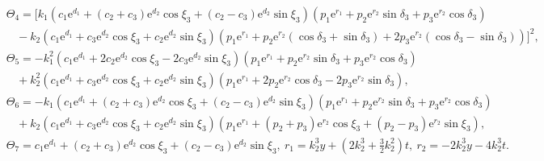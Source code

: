 \documentclass{article}%
\begin{document}
\begin{equation}
\begin{split}
&\Theta_4=\bigg[ k_1(c_1\text{e}^{d_1}+(c_2+c_3)\text{e}^{d_2}\cos\xi_3+(c_2-c_3)\text{e}^{d_2}\sin\xi_3)(p_1\text{e}^{r_1}+p_2\text{e}^{r_2}\sin\delta_3+p_3\text{e}^{r_2}\cos\delta_3)\\
&~~~~-k_2(c_1\text{e}^{d_1}+c_3\text{e}^{d_2}\cos\xi_3+c_2\text{e}^{d_2}\sin\xi_3)(p_1\text{e}^{r_1} +p_2\text{e}^{r_2}(\cos\delta_3+\sin\delta_3) +2p_3\text{e}^{r_2}(\cos\delta_3-\sin\delta_3))\bigg]^2,\\
&\Theta_5=-k_1^2(c_1\text{e}^{d_1}+2c_2\text{e}^{d_2}\cos\xi_3-2c_3\text{e}^{d_2}\sin\xi_3)(p_1\text{e}^{r_1}+p_2\text{e}^{r_2}\sin\delta_3+p_3\text{e}^{r_2}\cos\delta_3)\\
&~~~~+k_2^2(c_1\text{e}^{d_1}+c_3\text{e}^{d_2}\cos\xi_3+c_2\text{e}^{d_2}\sin\xi_3)(p_1\text{e}^{r_1}+2p_2\text{e}^{r_2}\cos\delta_3-2p_3\text{e}^{r_2}\sin\delta_3),  \\
&\Theta_6=-k_1(c_1\text{e}^{d_1}+(c_2+c_3)\text{e}^{d_2}\cos\xi_3+(c_2-c_3)\text{e}^{d_2}\sin\xi_3)(p_1\text{e}^{r_1}+p_2\text{e}^{r_2}\sin\delta_3+p_3\text{e}^{r_2}\cos\delta_3)\\
&~~~~+k_2(c_1\text{e}^{d_1}+c_3\text{e}^{d_2}\cos\xi_3+c_2\text{e}^{d_2}\sin\xi_3)(p_1\text{e}^{r_1}+(p_2+p_3)\text{e}^{r_2}\cos\xi_3+(p_2-p_3)\text{e}^{r_2}\sin\xi_3),\\
&\Theta_7=c_1\text{e}^{d_1}+(c_2+c_3)\text{e}^{d_2}\cos\xi_3+(c_2-c_3)\text{e}^{d_2}\sin\xi_3,~
r_1=k_2^3y+(2k_2^3+\frac{3}{2}k_2^2)t,~
r_2=-2k_2^3y-4k_2^3t.
\end{split}
\end{equation}
\end{document}
